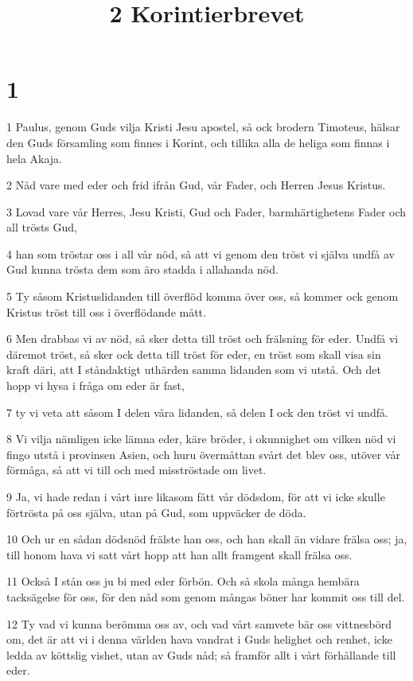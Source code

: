 

\title{2 Korintierbrevet}


\chapter{1}

\par 1 Paulus, genom Guds vilja Kristi Jesu apostel, så ock brodern Timoteus, hälsar den Guds församling som finnes i Korint, och tillika alla de heliga som finnas i hela Akaja.
\par 2 Nåd vare med eder och frid ifrån Gud, vår Fader, och Herren Jesus Kristus.
\par 3 Lovad vare vår Herres, Jesu Kristi, Gud och Fader, barmhärtighetens Fader och all trösts Gud,
\par 4 han som tröstar oss i all vår nöd, så att vi genom den tröst vi själva undfå av Gud kunna trösta dem som äro stadda i allahanda nöd.
\par 5 Ty såsom Kristuslidanden till överflöd komma över oss, så kommer ock genom Kristus tröst till oss i överflödande mått.
\par 6 Men drabbas vi av nöd, så sker detta till tröst och frälsning för eder. Undfå vi däremot tröst, så sker ock detta till tröst för eder, en tröst som skall visa sin kraft däri, att I ståndaktigt uthärden samma lidanden som vi utstå. Och det hopp vi hysa i fråga om eder är fast,
\par 7 ty vi veta att såsom I delen våra lidanden, så delen I ock den tröst vi undfå.
\par 8 Vi vilja nämligen icke lämna eder, käre bröder, i okunnighet om vilken nöd vi fingo utstå i provinsen Asien, och huru övermåttan svårt det blev oss, utöver vår förmåga, så att vi till och med misströstade om livet.
\par 9 Ja, vi hade redan i vårt inre likasom fått vår dödsdom, för att vi icke skulle förtrösta på oss själva, utan på Gud, som uppväcker de döda.
\par 10 Och ur en sådan dödsnöd frälste han oss, och han skall än vidare frälsa oss; ja, till honom hava vi satt vårt hopp att han allt framgent skall frälsa oss.
\par 11 Också I stån oss ju bi med eder förbön. Och så skola många hembära tacksägelse för oss, för den nåd som genom mångas böner har kommit oss till del.
\par 12 Ty vad vi kunna berömma oss av, och vad vårt samvete bär oss vittnesbörd om, det är att vi i denna världen hava vandrat i Guds helighet och renhet, icke ledda av köttslig vishet, utan av Guds nåd; så framför allt i vårt förhållande till eder.
